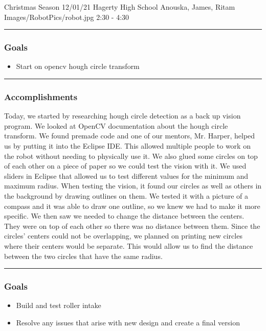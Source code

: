 \insertmeeting 
	{Christmas Season} 
	{12/01/21}
	{Hagerty High School}
	{Anouska, James, Ritam}
	{Images/RobotPics/robot.jpg}
	{2:30 - 4:30}
	
\noindent\hfil\rule{\textwidth}{.4pt}\hfil
\subsubsection*{Goals}
\begin{itemize}
    \item Start on opencv hough circle transform   

\end{itemize} 

\noindent\hfil\rule{\textwidth}{.4pt}\hfil

\subsubsection*{Accomplishments}
Today, we started by researching hough circle detection as a back up vision program. We looked at OpenCV documentation about the hough circle transform. We found premade code and one of our mentors, Mr. Harper, helped us by putting it into the Eclipse IDE. This allowed multiple people to work on the robot without needing to physically use it. We also glued some circles on top of each other on a piece of paper so we could test the vision with it. We used sliders in Eclipse that allowed us to test different values for the minimum and maximum radius. When testing the vision, it found our circles as well as others in the background by drawing outlines on them. We tested it with a picture of a compass and it was able to draw one outline, so we knew we had to make it more specific. We then saw we needed to change the distance between the centers. They were on top of each other so there was no distance between them. Since the circles' centers could not be overlapping, we planned on printing new circles where their centers would be separate. This would allow us to find the distance between the two circles that have the same radius.

\noindent\hfil\rule{\textwidth}{.4pt}\hfil
\subsubsection*{Goals}
\begin{itemize}
    \item Build and test roller intake
	\item Resolve any issues that arise with new design and create a final version


\end{itemize} 

